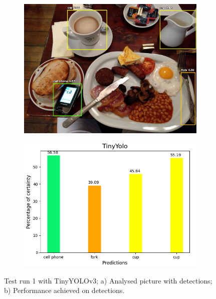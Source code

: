           \begin{figure}[H]
            \centering
            \captionsetup{justification=centering}
    
            \begin{subfigure}{0.29\textwidth}
            \includegraphics[width=\textwidth]{Sections/4InitialWork/4_images_obj_run1/yolo_tiny.jpg} 
            \caption{}
            \end{subfigure}
            \begin{subfigure}{0.4\textwidth}
            \includegraphics[width=\textwidth]{Sections/4InitialWork/4_images_obj_run1/tiny_yolo_graph.png}
            \caption{}
            \end{subfigure}
            
            \caption[Test run 1 with TinyYOLOv3]{ 
            Test run 1 with TinyYOLOv3; a) Analysed picture with detections; b) Performance achieved on detections. }
            \label{fig:tiny_1}
            \end{figure}

